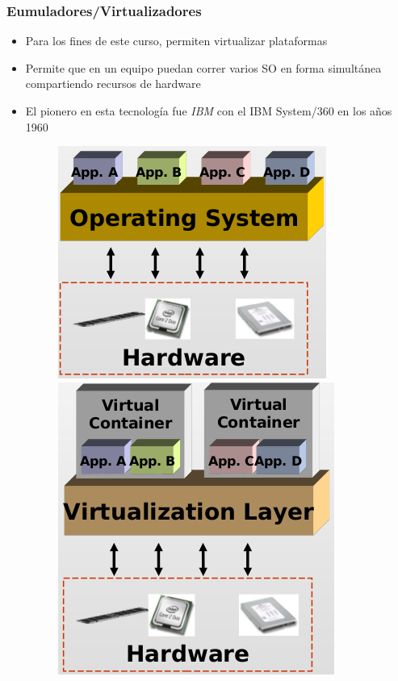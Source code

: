\begin{frame}
	\frametitle{Eumuladores/Virtualizadores}
	\begin{itemize}
		\item Para los fines de este curso, permiten virtualizar plataformas
		\item Permite que en un equipo puedan correr varios SO en forma simultánea compartiendo recursos de hardware
		\item El pionero en esta tecnología fue \emph{IBM} con el IBM System/360 en los años 1960
		\begin{figure}[h]
			\includegraphics[scale=0.3]{images/virt1.png}
			\hspace{30px}
			\includegraphics[scale=0.3]{images/virt2.png}
		\end{figure}
	\end{itemize}
\end{frame}

